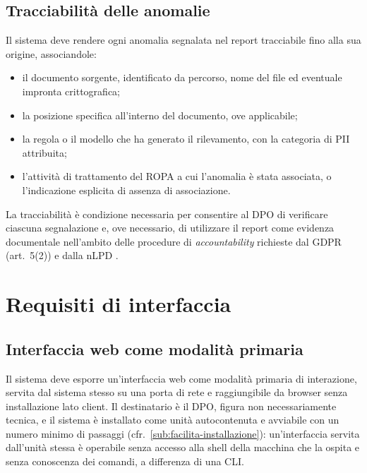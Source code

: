\subsection{Tracciabilità delle anomalie}
\label{sub:tracciabilita}
Il sistema deve rendere ogni anomalia segnalata nel report tracciabile fino alla sua origine, associandole:
\begin{itemize}
	\item il documento sorgente, identificato da percorso, nome del file ed eventuale impronta crittografica;
	\item la posizione specifica all'interno del documento, ove applicabile;
	\item la regola o il modello che ha generato il rilevamento, con la categoria di PII attribuita;
	\item l'attività di trattamento del ROPA a cui l'anomalia è stata associata, o l'indicazione esplicita di assenza di associazione.
\end{itemize} \medskip

La tracciabilità è condizione necessaria per consentire al DPO di verificare ciascuna segnalazione e, ove necessario, di utilizzare il report come evidenza documentale nell'ambito delle procedure di \textit{accountability} richieste dal GDPR (art.~5(2)) \cite{RegolamentoUE20162016} e dalla nLPD \cite{RS2351Legge}.


\section{Requisiti di interfaccia}
\label{sec:requisiti-interfaccia}

\subsection{Interfaccia web come modalità primaria}
\label{sub:interfaccia-web}
Il sistema deve esporre un'interfaccia web come modalità primaria di interazione, servita dal sistema stesso su una porta di rete e raggiungibile da browser senza installazione lato client. Il destinatario è il DPO, figura non necessariamente tecnica, e il sistema è installato come unità autocontenuta e avviabile con un numero minimo di passaggi (cfr.~\ref{sub:facilita-installazione}): un'interfaccia servita dall'unità stessa è operabile senza accesso alla shell della macchina che la ospita e senza conoscenza dei comandi, a differenza di una CLI. \medskip

